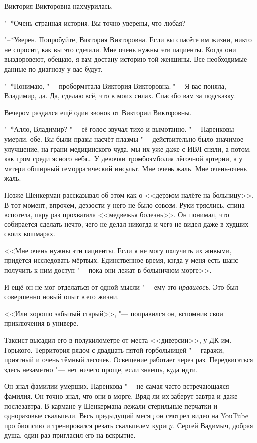 Виктория Викторовна нахмурилась.

"--*Очень странная история.
Вы точно уверены, что любая?

"--*Уверен.
Попробуйте, Виктория Викторовна.
Если вы спасёте им жизни, никто не спросит, как вы это сделали.
Мне очень нужны эти пациенты.
Когда они выздоровеют, обещаю, я вам достану историю той женщины.
Все необходимые данные по диагнозу у вас будут.

"--*Понимаю, "--- пробормотала Виктория Викторовна.
"--- Я вас поняла, Владимир, да.
Да, сделаю всё, что в моих силах.
Спасибо вам за подсказку.

Вечером раздался ещё один звонок от Виктории Викторовны.

"--*Алло, Владимир? "--- её голос звучал тихо и вымотанно.
"--- Наренковы умерли, обе.
Вы были правы насчёт плазмы "--- действительно было значимое улучшение, на грани медицинского чуда, мы их уже даже с ИВЛ сняли, а потом, как гром среди ясного неба\ldots{}
У девочки тромбоэмболия лёгочной артерии, а у матери обширный геморрагический инсульт.
Мне очень жаль.
Мне очень-очень жаль.

\asterism

Позже Шенкерман рассказывал об этом как о <<дерзком налёте на больницу>>.
В тот момент, впрочем, дерзости у него не было совсем.
Руки тряслись, спина вспотела, пару раз прохватила <<медвежья болезнь>>.
Он понимал, что собирается сделать нечто, чего не делал никогда и чего не видел даже в худших своих кошмарах.

<<Мне очень нужны эти пациенты.
Если я не могу получить их живыми, придётся исследовать мёртвых.
Единственное время, когда у меня есть шанс получить к ним доступ "--- пока они лежат в больничном морге>>.

И ещё он не мог отделаться от одной мысли "--- ему это \emph{нравилось}.
Это был совершенно новый опыт в его жизни.

<<Или хорошо забытый старый>>, "--- поправился он, вспомнив свои приключения в универе.

Таксист высадил его в полукилометре от места <<диверсии>>, у ДК им. Горького.
Территория рядом с двадцать пятой горбольницей "--- гаражи, приятный и очень тёмный лесочек.
Освещение работает через раз.
Передвигаться здесь незаметно "--- нет ничего проще, если знаешь, куда идти.

Он знал фамилии умерших.
Наренкова "--- не самая часто встречающаяся фамилия.
Он точно знал, что они в морге.
Вряд ли их заберут завтра и даже послезавтра.
В кармане у Шенкермана лежали стерильные перчатки и одноразовые скальпели.
Весь предыдущий месяц он смотрел видео на YouTube про биопсию и тренировался резать скальпелем курицу.
Сергей Вадимыч, добрая душа, один раз пригласил его на вскрытие.

